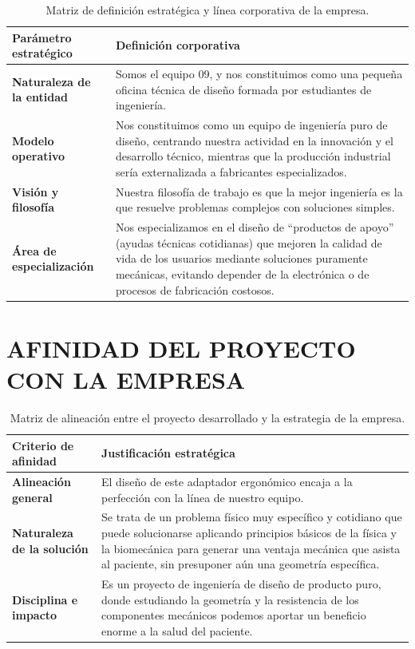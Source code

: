 \documentclass[11pt,a4paper]{article}
\begin{document}
\renewcommand{\arraystretch}{1.6}
\begin{table}[H]
\centering\small
\begin{tabular}{|p{3.8cm}|p{10.2cm}|}
\hline
\rowcolor{ArthroNavy}
\textbf{\color{white}Parámetro estratégico} & \textbf{\color{white}Definición corporativa} \\
\hline
\textbf{Naturaleza de la entidad} & Somos el equipo 09, y nos constituimos como una pequeña oficina técnica de diseño formada por estudiantes de ingeniería. \\
\hline
\textbf{Modelo operativo} & Nos constituimos como un equipo de ingeniería puro de diseño, centrando nuestra actividad en la innovación y el desarrollo técnico, mientras que la producción industrial sería externalizada a fabricantes especializados. \\
\hline
\textbf{Visión y filosofía} & Nuestra filosofía de trabajo es que la mejor ingeniería es la que resuelve problemas complejos con soluciones simples. \\
\hline
\textbf{Área de especialización} & Nos especializamos en el diseño de ``productos de apoyo'' (ayudas técnicas cotidianas) que mejoren la calidad de vida de los usuarios mediante soluciones puramente mecánicas, evitando depender de la electrónica o de procesos de fabricación costosos. \\
\hline
\end{tabular}
\caption{Matriz de definición estratégica y línea corporativa de la empresa.}
\end{table}

\newpage
\section{AFINIDAD DEL PROYECTO CON LA EMPRESA}


\renewcommand{\arraystretch}{1.6}
\begin{table}[H]
\centering\small
\begin{tabular}{|p{3.8cm}|p{10.2cm}|}
\hline
\rowcolor{ArthroNavy}
\textbf{\color{white}Criterio de afinidad} & \textbf{\color{white}Justificación estratégica} \\
\hline
\textbf{Alineación general} & El diseño de este adaptador ergonómico encaja a la perfección con la línea de nuestro equipo. \\
\hline
\textbf{Naturaleza de la solución} & Se trata de un problema físico muy específico y cotidiano que puede solucionarse aplicando principios básicos de la física y la biomecánica para generar una ventaja mecánica que asista al paciente, sin presuponer aún una geometría específica. \\
\hline
\textbf{Disciplina e impacto} & Es un proyecto de ingeniería de diseño de producto puro, donde estudiando la geometría y la resistencia de los componentes mecánicos podemos aportar un beneficio enorme a la salud del paciente. \\
\hline
\end{tabular}
\caption{Matriz de alineación entre el proyecto desarrollado y la estrategia de la empresa.}
\end{table}
\end{document}
